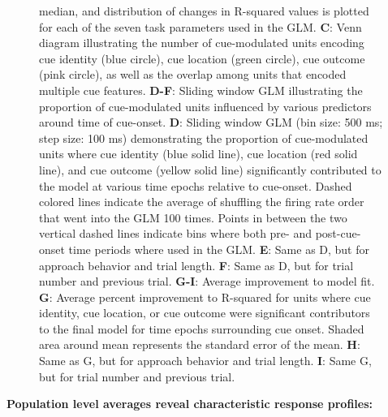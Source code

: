 \documentclass[11pt]{article}
\newcommand{\bsf}[1]{\textbf{#1}}
\begin{document}
\begin{figure}[ht!]
{median, and distribution of changes in R-squared values is plotted for each of
the seven task parameters used in the GLM. \bsf{C}: Venn diagram illustrating the number of cue-modulated units encoding cue identity (blue circle), cue location (green circle), cue outcome (pink circle), as well as the overlap among units that encoded multiple cue features. \bsf{D-F}: Sliding window GLM illustrating the proportion of cue-modulated units influenced by various predictors around time of cue-onset. \bsf{D}: Sliding window GLM (bin size: 500 ms; step size: 100 ms) demonstrating the proportion of cue-modulated units where cue identity (blue solid line), cue location (red solid line), and cue outcome (yellow solid line) significantly contributed to the model at various time epochs relative to cue-onset. Dashed colored lines indicate the average of shuffling the firing rate order that went into the GLM 100 times. Points in between the two vertical dashed lines indicate bins where both pre- and post-cue-onset time periods where used in the GLM. \bsf{E}: Same as D, but for approach behavior and trial length. \bsf{F}: Same as D, but for trial number and previous trial. \bsf{G-I}: Average improvement to model fit. \bsf{G}: Average percent improvement to R-squared for units where cue identity, cue location, or cue outcome were significant contributors to the final model for time epochs surrounding cue onset. Shaded area around mean represents the standard error of the mean. \bsf{H}: Same as G, but for approach behavior and trial length. \bsf{I}: Same G, but for trial number and previous trial.}
\label{fig:GLM}
\end{figure} \clearpage

{\bf Population level averages reveal characteristic response profiles:}
\end{document}
